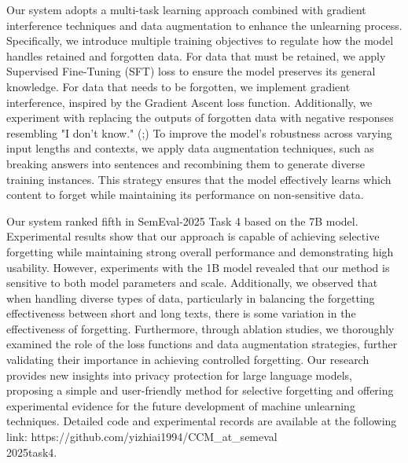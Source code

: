 \documentclass[11pt]{article}
\begin{document}
Our system adopts a multi-task learning approach combined with gradient interference techniques and data augmentation to enhance the unlearning process. Specifically, we introduce multiple training objectives to regulate how the model handles retained and forgotten data. 
For data that must be retained, we apply Supervised Fine-Tuning (SFT) loss to ensure the model preserves its general knowledge. 
For data that needs to be forgotten, we implement gradient interference, inspired by the Gradient Ascent loss function. Additionally, we experiment with replacing the outputs of forgotten data with negative responses resembling  "I don’t know." (\citet{choi2024snap};\citet{shi2024ulmr}) 
To improve the model's robustness across varying input lengths and contexts, we apply data augmentation techniques, such as breaking answers into sentences and recombining them to generate diverse training instances. 
This strategy ensures that the model effectively learns which content to forget while maintaining its performance on non-sensitive data.

Our system ranked fifth in SemEval-2025 Task 4 based on the 7B model. 
Experimental results show that our approach is capable of achieving selective forgetting while maintaining strong overall performance and demonstrating high usability. 
However, experiments with the 1B model revealed that our method is sensitive to both model parameters and scale. 
Additionally, we observed that when handling diverse types of data, particularly in balancing the forgetting effectiveness between short and long texts, there is some variation in the effectiveness of forgetting.
Furthermore, through ablation studies, we thoroughly examined the role of the loss functions and data augmentation strategies, further validating their importance in achieving controlled forgetting. 
Our research provides new insights into privacy protection for large language models, proposing a simple and user-friendly method for selective forgetting and offering experimental evidence for the future development of machine unlearning techniques. 
Detailed code and experimental records are available at the following link: https://github.com/yizhiai1994/CCM\_at\_semeval\\2025task4.
\end{document}
